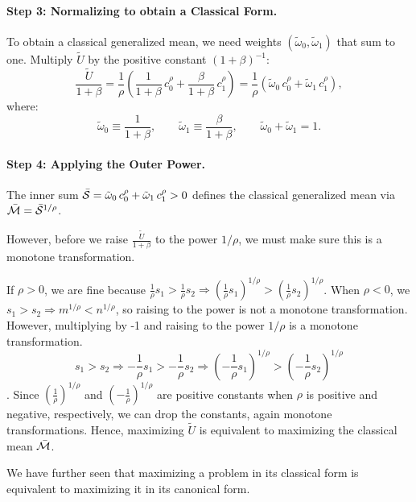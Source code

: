 \paragraph{Step 3: Normalizing to  obtain a Classical Form.}
To obtain a classical generalized mean, we need weights $(\tilde{\omega}_0, \tilde{\omega}_1)$ that sum to one. Multiply $\tilde{U}$ by the positive constant $(1+\beta)^{-1}$:
\begin{equation}
\frac{\tilde{U}}{1+\beta} = \frac{1}{\rho} \left( \frac{1}{1+\beta} \, c_0^{\rho} + \frac{\beta}{1+\beta} \, c_1^{\rho} \right) = \frac{1}{\rho} \left( \tilde{\omega}_0 \, c_0^{\rho} + \tilde{\omega}_1 \, c_1^{\rho} \right),
\label{eq:U-classical-inner}
\end{equation}
where:
\begin{equation}
\tilde{\omega}_0 \equiv \frac{1}{1+\beta}, \qquad \tilde{\omega}_1 \equiv \frac{\beta}{1+\beta}, \qquad \tilde{\omega}_0 + \tilde{\omega}_1 = 1.
\label{eq:classical-weights-def}
\end{equation}

\paragraph{Step 4: Applying the Outer Power.}
The inner sum $\bar{\mathcal{S}} = \tilde{\omega}_0 \, c_0^{\rho} + \tilde{\omega}_1 \, c_1^{\rho}>0$ defines the classical generalized mean via $\bar{\mathcal{M}} = \bar{\mathcal{S}}^{1/\rho}$. 

However, before we raise $\frac{\tilde{U}}{1+\beta}$ to the power $1/\rho$, we must make sure this is a monotone transformation. 

If $\rho>0$, we are fine because $\frac{1}{\rho}s_1>\frac{1}{\rho}s_2\Rightarrow \left(\frac{1}{\rho}s_1\right)^{1/\rho}>\left(\frac{1}{\rho}s_2\right)^{1/\rho}$. When $\rho<0$, we $s_1>s_2\Rightarrow m^{1/\rho}<n^{1/\rho}$, so raising to the power is not a monotone transformation. However, multiplying by -1 and raising to the power $1/\rho$ is a monotone transformation. 
\[
s_1>s_2 \Rightarrow -\frac{1}{\rho}s_1>-\frac{1}{\rho}s_2\Rightarrow \left(-\frac{1}{\rho}s_1\right)^{1/\rho}>\left(-\frac{1}{\rho}s_2\right)^{1/\rho}
\]. 
Since $\left(\frac{1}{\rho}\right)^{1/\rho}$ and $\left(-\frac{1}{\rho}\right)^{1/\rho}$ are positive constants when $\rho$ is positive and negative, respectively, we can drop the constants, again monotone transformations. Hence, maximizing $\tilde{U}$ is equivalent to maximizing the classical mean $\bar{\mathcal{M}}$.

We have further seen that maximizing a problem in its classical form is equivalent to maximizing it in its canonical form.

